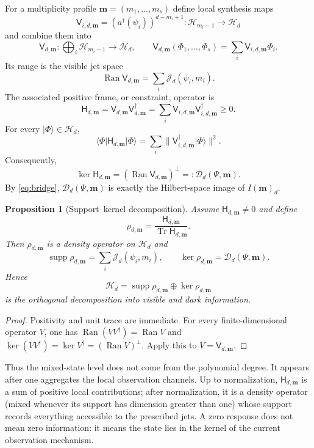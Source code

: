 \documentclass[11pt]{article}
\newtheorem{proposition}[theorem]{Proposition}
\theoremstyle{remark}
\newcommand{\cD}{\mathcal D}
\newcommand{\cJ}{\mathcal J}
\newcommand{\HH}{\mathcal H}
\newcommand{\Ran}{\operatorname{Ran}}
\newcommand{\supp}{\operatorname{supp}}
\newcommand{\Tr}{\operatorname{Tr}}
\newcommand{\ket}[1]{\lvert #1\rangle}
\newcommand{\bra}[1]{\langle #1\rvert}
\begin{document}
For a multiplicity profile $\mathbf m=(m_1,\ldots,m_s)$ define local synthesis maps
\[
  \mathsf V_{i,d,\mathbf m}
  =(a^\dagger(\psi_i))^{d-m_i+1}:\HH_{m_i-1}\longrightarrow\HH_d
\]
and combine them into
\[
  \mathsf V_{d,\mathbf m}:\bigoplus_i\HH_{m_i-1}\longrightarrow\HH_d,
  \qquad
  \mathsf V_{d,\mathbf m}(\Phi_1,\ldots,\Phi_s)
  =\sum_i\mathsf V_{i,d,\mathbf m}\Phi_i.
\]
Its range is the visible jet space
\[
  \Ran\mathsf V_{d,\mathbf m}=\sum_i\cJ_d(\psi_i,m_i).
\]
The associated positive frame, or constraint, operator is
\begin{equation}
  \mathsf H_{d,\mathbf m}
  =\mathsf V_{d,\mathbf m}\mathsf V_{d,\mathbf m}^\dagger
  =\sum_i\mathsf V_{i,d,\mathbf m}\mathsf V_{i,d,\mathbf m}^\dagger\ge0.
  \label{eq:constraintH}
\end{equation}
For every $\ket\Phi\in\HH_d$,
\[
  \bra\Phi\mathsf H_{d,\mathbf m}\ket\Phi
  =\sum_i\|\mathsf V_{i,d,\mathbf m}^\dagger\ket\Phi\|^2.
\]
Consequently,
\begin{equation}
  \ker\mathsf H_{d,\mathbf m}
  =\left(\Ran\mathsf V_{d,\mathbf m}\right)^\perp
  =:\cD_d(\Psi,\mathbf m).
  \label{eq:darkkernel}
\end{equation}
By \eqref{eq:bridge}, $\cD_d(\Psi,\mathbf m)$ is exactly the Hilbert-space image of $I(\mathbf m)_d$.

\begin{proposition}[Support--kernel decomposition]
Assume $\mathsf H_{d,\mathbf m}\ne0$ and define
\[
  \rho_{d,\mathbf m}
  =\frac{\mathsf H_{d,\mathbf m}}{\Tr\mathsf H_{d,\mathbf m}}.
\]
Then $\rho_{d,\mathbf m}$ is a density operator on $\HH_d$ and
\[
  \supp\rho_{d,\mathbf m}=\sum_i\cJ_d(\psi_i,m_i),
  \qquad
  \ker\rho_{d,\mathbf m}=\cD_d(\Psi,\mathbf m).
\]
Hence
\[
  \HH_d=\supp\rho_{d,\mathbf m}\oplus\ker\rho_{d,\mathbf m}
\]
is the orthogonal decomposition into visible and dark information.
\end{proposition}

\begin{proof}
Positivity and unit trace are immediate.  For every finite-dimensional operator $V$, one has $\Ran(VV^\dagger)=\Ran V$ and $\ker(VV^\dagger)=\ker V^\dagger=(\Ran V)^\perp$.  Apply this to $V=\mathsf V_{d,\mathbf m}$.
\end{proof}

Thus the mixed-state level does not come from the polynomial degree.  It appears after one aggregates the local observation channels.  Up to normalization, $\mathsf H_{d,\mathbf m}$ is a sum of positive local contributions; after normalization, it is a density operator (mixed whenever its support has dimension greater than one) whose support records everything accessible to the prescribed jets.  A zero response does not mean zero information: it means the state lies in the kernel of the current observation mechanism.
\end{document}
